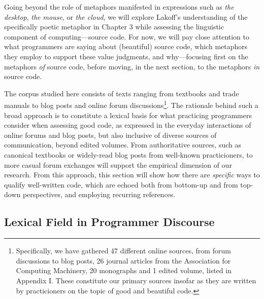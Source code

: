 Going beyond the role of metaphors manifested in expressions such as \emph{the desktop}, \emph{the mouse}, or \emph{the cloud}, we will explore Lakoff's understanding of the specifically poetic metaphor in Chapter 3 while assessing the linguistic component of computing—source code. For now, we will pay close attention to what programmers are saying about (beautiful) source code, which metaphors they employ to support these value judgments, and why—focusing first on the metaphors \emph{of} source code, before moving, in the next section, to the metaphors \emph{in} source code.

The corpus studied here consists of texts ranging from textbooks and trade manuals to blog posts and online forum discussions\footnote{Specifically, we have gathered 47 different online sources, from forum discussions to blog posts, 26 journal articles from the Association for Computing Machinery, 20 monographs and 1 edited volume, listed in Appendix I. These constitute our primary sources insofar as they are written by practicioners on the topic of good and beautiful code.}. The rationale behind such a broad approach is to constitute a lexical basis for what practicing programmers consider when assessing good code, as expressed in the everyday interactions of online forums and blog posts, but also inclusive of diverse sources of communication, beyond edited volumes. From authoritative sources, such as canonical textbooks or widely-read blog posts from well-known practicioners, to more casual forum exchanges will support the empirical dimension of our research. From this approach, this section will show how there are \emph{specific} ways to qualify well-written code, which are echoed both from bottom-up and from top-down perspectives, and employing recurring references.

\subsection{Lexical Field in Programmer Discourse}

